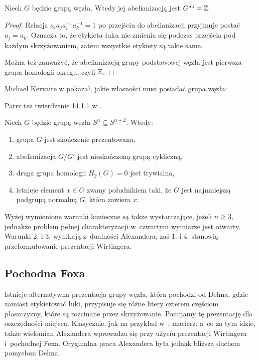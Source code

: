 \begin{corollary}
    \label{prop:knot_group_abelianisation}
    Niech $G$ będzie grupą węzła.
    Wtedy jej abelianizacją jest $G^{\operatorname{ab}} = \mathbb Z$.
\end{corollary}

\begin{proof}
    Relacja $a_ia_ja_i^{-1}a_k^{-1}=1$ po przejściu do abelianizacji przyjmuje postać $a_j = a_k$.
    Oznacza to, że etykieta łuku nie zmienia się podczas przejścia pod każdym skrzyżowaniem, zatem wszystkie etykiety są takie same.

    Można też zauważyć, że abelianizacją grupy podstawowej węzła jest pierwsza grupa homologii okręgu, czyli $\mathbb Z$.
\end{proof}

Michael Kervaire w \cite{kervaire65} pokazał, jakie własności musi posiadać grupa węzła:

\begin{tobedone}
Patrz też twierdzenie 14.1.1 w \cite{kawauchi96}.
\end{tobedone}

\begin{proposition}
    Niech $G$ będzie grupą węzła $S^n \subseteq S^{n+2}$.
    Wtedy:
    \begin{enumerate}[leftmargin=*]
        \itemsep0em
        \item grupa $G$ jest skończenie prezentowana,
        \item abelianizacja $G/G'$ jest nieskończoną grupą cykliczną,
        \item druga grupa homologii $H_2(G) = 0$ jest trywialna,
        \item istnieje element $x \in G$ zwany południkiem taki, że $G$ jest najmniejszą podgrupą normalną $G$, która zawiera $x$.
    \end{enumerate}
\end{proposition}

Wyżej wymienione warunki konieczne są także wystarczające, jeżeli $n \ge 3$, jednakże problem pełnej charakteryzacji w~czwartym wymiarze jest otwarty.
Warunki 2. i 3. wynikają z~dualności Alexandera, zaś 1. i 4. stanowią przeformułowanie prezentacji Wirtingera.

\subsection{Pochodna Foxa}
Istnieje alternatywna prezentacja grupy węzła, która pochodzi od Dehna, gdzie zamiast etykietować łuki, przypisuje się różne litery czterem częściom płaszczyzny, które są rozcinane przez skrzyżowanie.
Pomijamy tę prezentację dla oszczędności miejsca.
Klasycznie, jak na przykład w~\cite{crowell63}, macierz, a~co za tym idzie, także wielomian Alexandera wprowadza się przy użyciu prezentacji Wirtingera i~pochodnej Foxa.
Oryginalna praca Alexandera była jednak bliższa duchem pomysłom Dehna.

